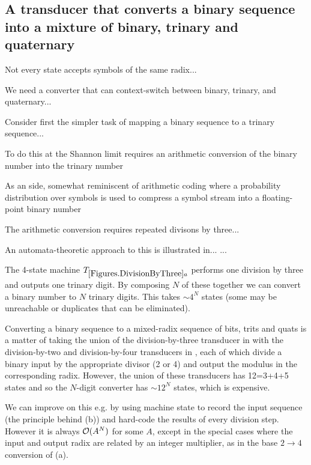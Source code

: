 \documentclass[english]{article}
\begin{document}
\subsection{A transducer that converts a binary sequence into a mixture of binary, trinary and quaternary}

Not every state accepts symbols of the same radix...

We need a converter that can context-switch between binary, trinary, and quaternary...

Consider first the simpler task of mapping a binary sequence to a trinary sequence...

To do this at the Shannon limit requires an arithmetic conversion of the binary number into the trinary number

As an side, somewhat reminiscent of arithmetic coding \cite{Mackay2003}
where a probability distribution over symbols is used to compress
a symbol stream into a floating-point binary number

The arithmetic conversion requires repeated divisons by three...

An automata-theoretic approach to this is illustrated in...
...

The 4-state machine $\transdivthree$ performs one division by three and outputs one trinary digit.
By composing $N$ of these together we can convert a binary number to $N$ trinary digits.
This takes $\sim 4^N$ states (some may be unreachable or duplicates that can be eliminated).

Converting a binary sequence to a mixed-radix sequence of bits, trits and quats
is a matter of taking the union of the division-by-three transducer
in 
with the division-by-two and division-by-four transducers
in ,
each of which divide a binary input by the appropriate divisor (2 or 4)
and output the modulus in the corresponding radix.
However, the union of these transducers has 12=3+4+5 states
and so the $N$-digit converter has $\sim 12^N$ states,
which is expensive.

We can improve on this e.g. by using machine state to record the input sequence
(the principle behind (b))
and hard-code the results of every division step.
However it is always ${\cal O}(A^N)$ for some $A$, except in the special cases where the input and output radix
are related by an integer multiplier, as in the base $2 \to 4$ conversion of (a).
\end{document}
